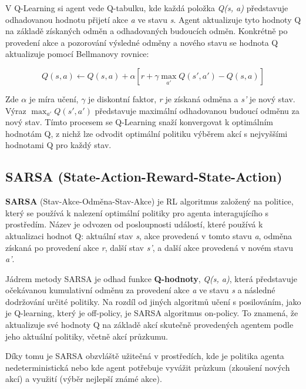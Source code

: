 V Q-Learning si agent vede Q-tabulku, kde každá položka \textit{Q(s, a)} představuje odhadovanou hodnotu přijetí akce \textit{a} ve stavu \textit{s}. Agent aktualizuje tyto hodnoty Q na základě získaných odměn a odhadovaných budoucích odměn. Konkrétně po provedení akce a pozorování výsledné odměny a nového stavu se hodnota Q aktualizuje pomocí Bellmanovy rovnice:

\begin{equation}
Q(s, a) \leftarrow Q(s, a) + \alpha \left[ r + \gamma \max_{a'} Q(s', a') - Q(s, a) \right]
\label{eq3.1}
\end{equation}

Zde $\alpha$ je míra učení, $\gamma$ je diskontní faktor, \textit{r} je získaná odměna a \textit{s'} je nový stav. Výraz \textit{$\max_{a'} Q(s', a')$} představuje maximální odhadovanou budoucí odměnu za nový stav. Tímto procesem se Q-Learning snaží konvergovat k optimálním hodnotám Q, z nichž lze odvodit optimální politiku výběrem akcí s nejvyššími hodnotami Q pro každý stav.

\subsection{SARSA (State-Action-Reward-State-Action)}
\textbf{SARSA} (Stav-Akce-Odměna-Stav-Akce)\cite{Sutton1998} je RL algoritmus založený na politice, který se používá k nalezení optimální politiky pro agenta interagujícího s prostředím. Název  je odvozen od posloupnosti událostí, které používá k aktualizaci hodnot Q: aktuální stav \textit{s}, akce provedená v tomto stavu \textit{a}, odměna získaná po provedení akce \textit{r}, další stav \textit{s'}, a další akce provedená v novém stavu \textit{a'}.

Jádrem metody SARSA je odhad funkce \textbf{Q-hodnoty}, \textit{Q(s, a)}, která představuje očekávanou kumulativní odměnu za provedení akce \textit{a} ve stavu \textit{s} a následné dodržování určité politiky. Na rozdíl od jiných algoritmů učení s posilováním, jako je Q-learning, který je off-policy, je SARSA algoritmus on-policy. To znamená, že aktualizuje své hodnoty Q na základě akcí skutečně provedených agentem podle jeho aktuální politiky, včetně akcí průzkumu. 

\newpage

Díky tomu je SARSA obzvláště užitečná v prostředích, kde je politika agenta nedeterministická nebo kde agent potřebuje vyvážit průzkum (zkoušení nových akcí) a využití (výběr nejlepší známé akce).

